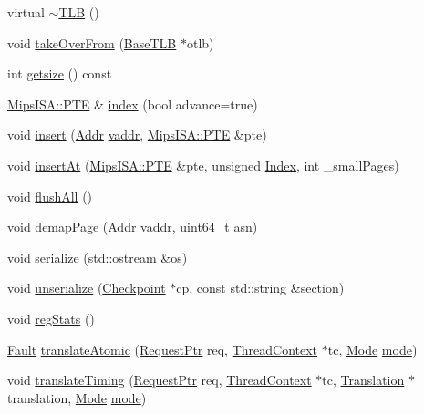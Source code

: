 \begin{DoxyCompactItemize}
\item 
virtual \hyperlink{classMipsISA_1_1TLB_a73de9f05aa85f9da8bc42faff89d5833}{$\sim$TLB} ()
\item 
void \hyperlink{classMipsISA_1_1TLB_a15b6c15c1be2ca4de3e65772a02aa29f}{takeOverFrom} (\hyperlink{classBaseTLB}{BaseTLB} $\ast$otlb)
\item 
int \hyperlink{classMipsISA_1_1TLB_ae121404a6cfcf714e05fe2231ce4c7fc}{getsize} () const 
\item 
\hyperlink{structMipsISA_1_1PTE}{MipsISA::PTE} \& \hyperlink{classMipsISA_1_1TLB_ac695a929cdc93bd1cc81c1c7f7c5d743}{index} (bool advance=true)
\item 
void \hyperlink{classMipsISA_1_1TLB_a3e394e68b30bef38db30203d2e4324d8}{insert} (\hyperlink{classm5_1_1params_1_1Addr}{Addr} \hyperlink{namespaceMipsISA_ac78d9788b3f9a366df64485c9afaf1b1}{vaddr}, \hyperlink{structMipsISA_1_1PTE}{MipsISA::PTE} \&pte)
\item 
void \hyperlink{classMipsISA_1_1TLB_ac8f8f13ac6850d331b331f6ed7fed5c8}{insertAt} (\hyperlink{structMipsISA_1_1PTE}{MipsISA::PTE} \&pte, unsigned \hyperlink{TypeDefines_8hh_a39642de41f3574937f399f4fab25ba18}{Index}, int \_\-smallPages)
\item 
void \hyperlink{classMipsISA_1_1TLB_aca1483a67aee5a91e442f7131d66bcbd}{flushAll} ()
\item 
void \hyperlink{classMipsISA_1_1TLB_a2d698ff909513b48a1263f8a5440e067}{demapPage} (\hyperlink{classm5_1_1params_1_1Addr}{Addr} \hyperlink{namespaceMipsISA_ac78d9788b3f9a366df64485c9afaf1b1}{vaddr}, uint64\_\-t asn)
\item 
void \hyperlink{classMipsISA_1_1TLB_a53e036786d17361be4c7320d39c99b84}{serialize} (std::ostream \&os)
\item 
void \hyperlink{classMipsISA_1_1TLB_af22e5d6d660b97db37003ac61ac4ee49}{unserialize} (\hyperlink{classCheckpoint}{Checkpoint} $\ast$cp, const std::string \&section)
\item 
void \hyperlink{classMipsISA_1_1TLB_a4dc637449366fcdfc4e764cdf12d9b11}{regStats} ()
\item 
\hyperlink{classRefCountingPtr}{Fault} \hyperlink{classMipsISA_1_1TLB_ad54e01e3c0a1613098a76b7f92e5be93}{translateAtomic} (\hyperlink{classRequest}{RequestPtr} req, \hyperlink{classThreadContext}{ThreadContext} $\ast$tc, \hyperlink{classBaseTLB_a46c8a310cf4c094f8c80e1cb8dc1f911}{Mode} \hyperlink{namespaceMipsISA_ae317cde5969f1a58116b73ae0d8adec0}{mode})
\item 
void \hyperlink{classMipsISA_1_1TLB_ae52f7e465748883695d2b4f432a13652}{translateTiming} (\hyperlink{classRequest}{RequestPtr} req, \hyperlink{classThreadContext}{ThreadContext} $\ast$tc, \hyperlink{classBaseTLB_1_1Translation}{Translation} $\ast$translation, \hyperlink{classBaseTLB_a46c8a310cf4c094f8c80e1cb8dc1f911}{Mode} \hyperlink{namespaceMipsISA_ae317cde5969f1a58116b73ae0d8adec0}{mode})

\end{DoxyCompactItemize}

